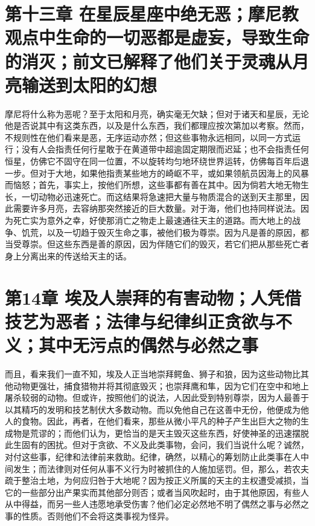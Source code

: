 
\section{第十三章 在星辰星座中绝无恶；摩尼教观点中生命的一切恶都是虚妄，导致生命的消灭；前文已解释了他们关于灵魂从月亮输送到太阳的幻想}

摩尼将什么称为恶呢？至于太阳和月亮，确实毫无欠缺；但对于诸天和星辰，无论他是否说其中有这类东西，以及是什么东西，我们都理应按次第加以考察。然而，不规则性在他们看来是恶，无序运动亦然；但这些事物永远相同，以同一方式运行；没有人会指责任何行星敢于在黄道带中超逾固定期限而迟延；也不会指责任何恒星，仿佛它不固守在同一位置，不以旋转均匀地环绕世界运转，仿佛每百年后退一步。但对于大地，如果他指责某些地方的崎岖不平，或如果领航员因海上的风暴而恼怒；首先，事实上，按他们所想，这些事都有善在其中。因为倘若大地无物生长，一切动物必迅速死亡。而这结果将急速把大量与物质混合的送到天主那里，因此需要许多月亮，去容纳那突然接近的巨大数量。对于海，他们也持同样说法。因为死亡实为意外之幸，好使那消亡之物走上最速通往天主的道路。而大地上的战争、饥荒，以及一切趋于毁灭生命之事，被他们极为尊崇。因为凡是善的原因，都当受尊崇。但这些东西是善的原因，因为伴随它们的毁灭，若它们把从那些死亡者身上分离出来的传送给天主的话。\par


\section{第14章 埃及人崇拜的有害动物；人凭借技艺为恶者；法律与纪律纠正贪欲与不义；其中无污点的偶然与必然之事}

而且，看来我们一直不知，埃及人正当地崇拜鳄鱼、狮子和狼，因为这些动物比其他动物更强壮，捕食猎物并将其彻底毁灭；也崇拜鹰和隼，因为它们在空中和地上屠杀较弱的动物。但或许，按照他们的说法，人因此受到特别尊崇，因为人最善于以其精巧的发明和技艺制伏大多数动物。而以免他自己在这善中无份，他便成为他人的食物。因此，再者，在他们看来，那些从微小平凡的种子产生出巨大之物的生成物是荒谬的；而他们认为，更恰当的是天主毁灭这些东西，好使神圣的迅速摆脱此生固有的困扰。但对于贪欲、不义及此类事物，会问，我们当说什么呢？诚然，对付这些事，纪律和法律前来救助。纪律，确然，以精心的筹划防止此类事在人中间发生；而法律则对任何从事不义行为时被抓住的人施加惩罚。但，那么，若农夫疏于整治土地，为何应归咎于大地呢？因为按正义所属的天主的主权遭受减损，当它的一些部分出产果实而其他部分则否；或者当风吹起时，由于其他原因，有些人从中得益，而另一些人违愿地承受伤害？他们必定必然地不明了偶然之事与必然之事的性质。否则他们不会将这类事视为怪异。\par

